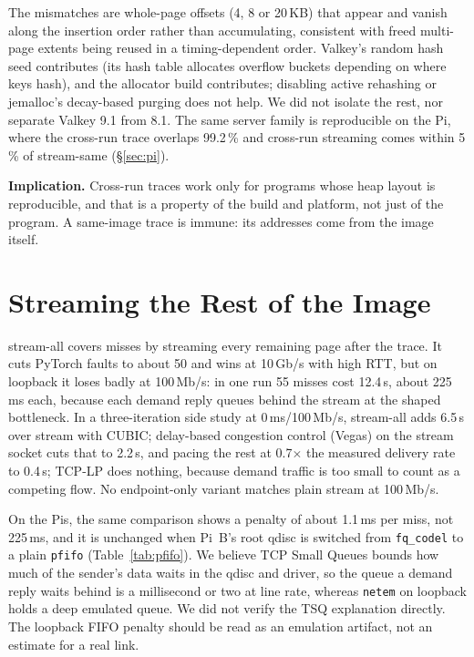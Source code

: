 \documentclass[conference]{IEEEtran}
\newcommand{\mode}[1]{\textsf{#1}}
\begin{document}
\noindent The mismatches are whole-page offsets (4, 8 or 20\,KB) that
appear and vanish along the insertion order rather than accumulating,
consistent with freed multi-page extents being reused in a timing-dependent
order. Valkey's random hash seed contributes (its hash table allocates
overflow buckets depending on where keys hash), and the allocator build
contributes; disabling active rehashing or jemalloc's decay-based purging
does not help. We did not isolate the rest, nor separate Valkey 9.1 from
8.1. The same server family is reproducible on the Pi, where the
cross-run trace overlaps 99.2\,\% and cross-run streaming comes within
5\,\% of \mode{stream-same} (\S\ref{sec:pi}).

\textbf{Implication.} Cross-run traces work only for programs whose heap
layout is reproducible, and that is a property of the build and platform,
not just of the program. A same-image trace is immune: its addresses come
from the image itself.

\section{Streaming the Rest of the Image}
\label{sec:rest}

\mode{stream-all} covers misses by streaming every remaining page after the
trace. It cuts PyTorch faults to about 50 and wins at 10\,Gb/s with high
RTT, but on loopback it loses badly at 100\,Mb/s: in one run 55 misses cost
12.4\,s, about 225\,ms each, because each demand reply queues behind the
stream at the shaped bottleneck. In a three-iteration side study at
0\,ms/100\,Mb/s, \mode{stream-all} adds 6.5\,s over \mode{stream} with
CUBIC; delay-based congestion control (Vegas) on the stream socket cuts that
to 2.2\,s, and pacing the rest at 0.7$\times$ the measured delivery rate to
0.4\,s; TCP-LP does nothing, because demand traffic is
too small to count as a competing flow. No endpoint-only variant matches
plain \mode{stream} at 100\,Mb/s.

On the Pis, the same comparison shows a penalty of about 1.1\,ms per miss,
not 225\,ms, and it is unchanged when Pi~B's root qdisc is switched from
\texttt{fq\_codel} to a plain \texttt{pfifo} (Table~\ref{tab:pfifo}). We
believe TCP Small Queues bounds how much of the sender's data waits in the
qdisc and driver, so the queue a demand reply waits behind is a millisecond
or two at line rate, whereas \texttt{netem} on loopback holds a deep emulated
queue. We did not verify the TSQ explanation directly. The loopback FIFO
penalty should be read as an emulation artifact, not an estimate for a real
link.
\end{document}
